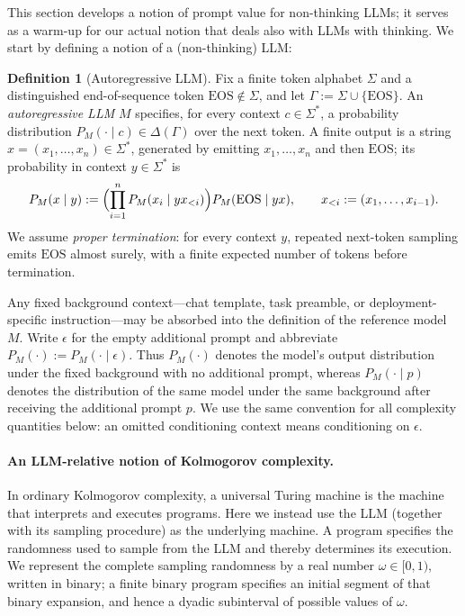 \documentclass[letterpaper]{article} %
\theoremstyle{definition}
\newtheorem{definition}[theorem]{Definition}
\theoremstyle{remark}
\newcommand{\eps}{\epsilon}
\newcommand{\EOS}{\mathrm{EOS}}
\begin{document}
This section develops a notion of prompt value for non-thinking LLMs; it serves as a warm-up for our actual notion that deals also with LLMs with thinking. We start by defining a notion of a (non-thinking) LLM:

\begin{definition}[Autoregressive LLM]\label{def:llm}
Fix a finite token alphabet $\Sigma$ and a distinguished end-of-sequence token
$\EOS \notin \Sigma$, and let $\Gamma := \Sigma \cup \{\EOS\}$. An
\emph{autoregressive LLM} $M$ specifies, for every context $c \in \Sigma^*$, a
probability distribution $P_M(\cdot \mid c) \in \Delta(\Gamma)$ over the next
token. A finite output is a string $x = (x_1,\dots,x_n) \in \Sigma^*$, generated
by emitting $x_1,\dots,x_n$ and then $\EOS$; its probability in context
$y \in \Sigma^*$ is
\begin{equation}\label{eq:seqprob}
P_M(x \mid y) := \Bigl( \prod_{i=1}^n P_M(x_i \mid y x_{<i}) \Bigr)
P_M(\EOS \mid y x),
\qquad x_{<i} := (x_1,\dots,x_{i-1}).
\end{equation}
We assume \emph{proper termination}: for every context $y$, repeated next-token
sampling emits $\EOS$ almost surely, with a finite expected number of tokens
before termination.
\end{definition}

Any fixed background context---chat template, task preamble,
or deployment-specific instruction---may be absorbed into the definition of
the reference model \(M\).  Write \(\eps\) for the empty additional prompt and
abbreviate $P_M(\cdot):=P_M(\cdot\mid\eps)$.
Thus \(P_M(\cdot)\) denotes the model's output distribution under the fixed
background with no additional prompt, whereas \(P_M(\cdot\mid p)\) denotes the
distribution of the same model under the same background after receiving the
additional prompt \(p\).  We use the same convention for all complexity
quantities below: an omitted conditioning context means conditioning on
\(\eps\).  

\paragraph{An LLM-relative notion of Kolmogorov complexity.}
In ordinary Kolmogorov complexity, a universal Turing machine is the machine
that interprets and executes programs.  Here we instead use the LLM (together
with its sampling procedure) as the underlying machine.  A program specifies
the randomness used to sample from the LLM and thereby determines its
execution.  We represent the complete sampling randomness by a real number
\(\omega\in[0,1)\), written in binary; a finite binary program specifies an
initial segment of that binary expansion, and hence a dyadic subinterval of
possible values of \(\omega\).
\end{document}
